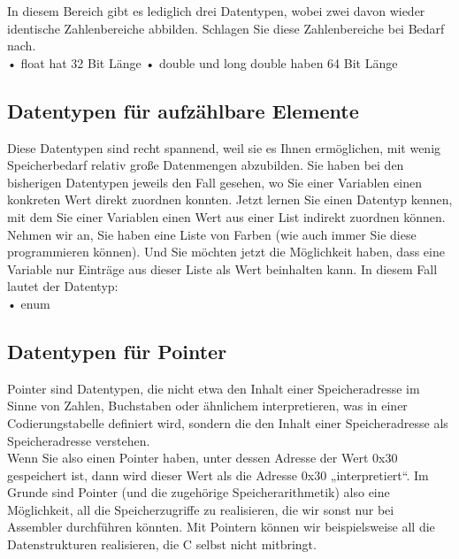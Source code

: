 In diesem Bereich gibt es lediglich drei Datentypen, wobei zwei davon wieder identische Zahlenbereiche abbilden. Schlagen Sie diese Zahlenbereiche bei Bedarf nach.\\

•	float hat 32 Bit Länge
•	double und long double haben 64 Bit Länge\\

\subsection{Datentypen für aufzählbare Elemente}

Diese Datentypen sind recht spannend, weil sie es Ihnen ermöglichen, mit wenig Speicherbedarf relativ große Datenmengen abzubilden. Sie haben bei den bisherigen Datentypen jeweils den Fall gesehen, wo Sie einer Variablen einen konkreten Wert direkt zuordnen konnten. Jetzt lernen Sie einen Datentyp kennen, mit dem Sie einer Variablen einen Wert aus einer List indirekt zuordnen können.\\

Nehmen wir an, Sie haben eine Liste von Farben (wie auch immer Sie diese programmieren können). Und Sie möchten jetzt die Möglichkeit haben, dass eine Variable nur Einträge aus dieser Liste als Wert beinhalten kann. In diesem Fall lautet der Datentyp:\\

•	enum\\

\subsection{Datentypen für Pointer}

Pointer sind Datentypen, die nicht etwa den Inhalt einer Speicheradresse im Sinne von Zahlen, Buchstaben oder ähnlichem interpretieren, was in einer Codierungstabelle definiert wird, sondern die den Inhalt einer Speicheradresse als Speicheradresse verstehen.\\

Wenn Sie also einen Pointer haben, unter dessen Adresse der Wert 0x30 gespeichert ist, dann wird dieser Wert als die Adresse 0x30 „interpretiert“. Im Grunde sind Pointer (und die zugehörige Speicherarithmetik) also eine Möglichkeit, all die Speicherzugriffe zu realisieren, die wir sonst nur bei Assembler durchführen könnten. Mit Pointern können wir beispielsweise all die Datenstrukturen realisieren, die C selbst nicht mitbringt.\\

